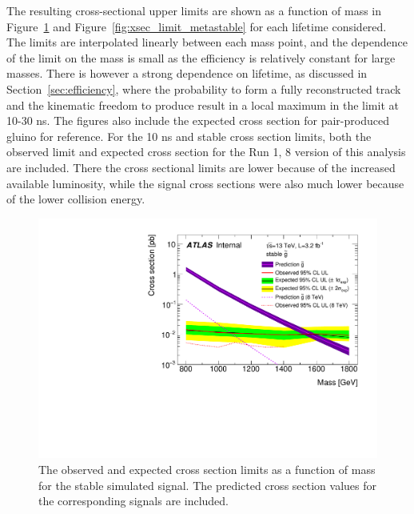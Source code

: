 The resulting cross-sectional upper limits are shown as a function of mass in Figure~\ref{fig:xsec_limit_stable} and Figure~\ref{fig:xsec_limit_metastable} for each lifetime considered.
The limits are interpolated linearly between each mass point, and the dependence of the limit on the mass is small as the efficiency is relatively constant for large \rhadron masses.
There is however a strong dependence on lifetime, as discussed in Section~\ref{sec:efficiency}, where the probability to form a fully reconstructed track and the kinematic freedom to produce \met result in a local maximum in the limit at 10-30 ns.
The figures also include the expected cross section for pair-produced gluino \rhadrons for reference.
For the 10 ns and stable cross section limits, both the observed limit and expected cross section for the Run 1, 8 \TeV version of this analysis are included.
There the cross sectional limits are lower because of the increased available luminosity, while the signal cross sections were also much lower because of the lower collision energy.

\begin{figure}
\centering
\includegraphics[width=\fullfig]{figures/xsec_limit_stable.pdf}
\caption{The observed and expected cross section limits as a function of mass for the stable simulated signal. The predicted cross section values for the corresponding signals are included.}
\label{fig:xsec_limit_stable}
\end{figure}

